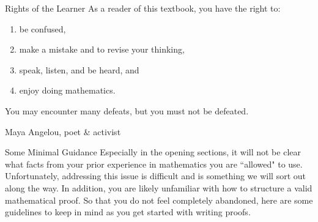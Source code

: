 \begin{section}{Rights of the Learner}\label{sec:Rights of the Learner}
As a reader of this textbook, you have the right to:
\begin{enumerate}
\item be confused,
\item make a mistake and to revise your thinking,
\item speak, listen, and be heard, and
\item enjoy doing mathematics.
\end{enumerate}

\epigraph{You may encounter many defeats, but you must not be defeated.}{Maya Angelou, poet \& activist}

\end{section}

\begin{section}{Some Minimal Guidance}\label{sec:guidance}
Especially in the opening sections, it will not be clear what facts from your prior experience in mathematics you are ``allowed" to use.  Unfortunately, addressing this issue is difficult and is something we will sort out along the way.  In addition, you are likely unfamiliar with how to structure a valid mathematical proof.  So that you do not feel completely abandoned, here are some guidelines to keep in mind as you get started with writing proofs.


\end{section}
